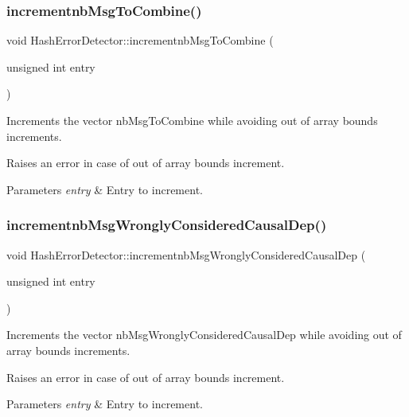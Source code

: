 \subsubsection{\texorpdfstring{incrementnb\+Msg\+To\+Combine()}{incrementnbMsgToCombine()}}
{\footnotesize\ttfamily void Hash\+Error\+Detector\+::incrementnb\+Msg\+To\+Combine (\begin{DoxyParamCaption}\item[{unsigned int}]{entry }\end{DoxyParamCaption})}



Increments the vector nb\+Msg\+To\+Combine while avoiding out of array bounds increments. 

Raises an error in case of out of array bounds increment. 
\begin{DoxyParams}{Parameters}
{\em entry} & Entry to increment. \\
\hline
\end{DoxyParams}
\mbox{\label{class_hash_error_detector_a007d537bdfd329c6b23b432b58d4cf4c}} 
\subsubsection{\texorpdfstring{incrementnb\+Msg\+Wrongly\+Considered\+Causal\+Dep()}{incrementnbMsgWronglyConsideredCausalDep()}}
{\footnotesize\ttfamily void Hash\+Error\+Detector\+::incrementnb\+Msg\+Wrongly\+Considered\+Causal\+Dep (\begin{DoxyParamCaption}\item[{unsigned int}]{entry }\end{DoxyParamCaption})}



Increments the vector nb\+Msg\+Wrongly\+Considered\+Causal\+Dep while avoiding out of array bounds increments. 

Raises an error in case of out of array bounds increment. 
\begin{DoxyParams}{Parameters}
{\em entry} & Entry to increment. \\
\hline
\end{DoxyParams}
\mbox{\label{class_hash_error_detector_a6aa56dfbb555e15093bd5d93a683fa42}} 
